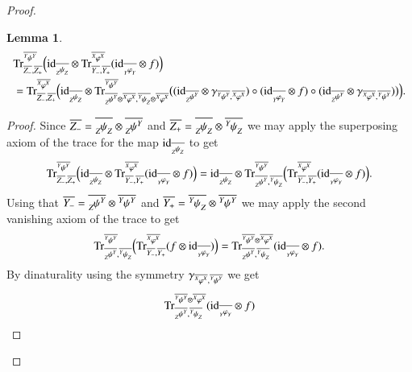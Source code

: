 \documentclass{amsart}
\def\tn{\textnormal}
\def\Trace{\tn{Tr}}
\def\ol{\overline}
\def\id{\tn{id}}
\newcommand{\inp}[1]{{#1_-}}
\newcommand{\outp}[1]{{#1_+}}
\newcommand{\feeddd}[3]{{\tensor*[^{#2}_{\color{white}{!}}]{{#1}}{^{#3}}}}%
\newcommand{\feeddc}[3]{{\tensor*[^{#2}]{{#1}}{_{#3}}}}
\newcommand{\feedcd}[3]{{\tensor*[_{#2}]{{#1}}{^{#3}}}}
\newcommand{\feedcc}[3]{{\tensor*[^{\color{white}{!}}_{#2}]{{#1}}{_{#3}}}}
\newtheorem{lemma}[subsubsection]{Lemma}
\theoremstyle{remark}
\theoremstyle{definition}
\begin{document}
\begin{proof}
\begin{lemma}\label{le:combining traces}
 \begin{align*}
&\Trace^{\ol{\feeddd{\psi}{Y}{Y}}}_{\ol{Z_-},\ol{Z_+}}
\Big(
\id_{\ol{\feedcc{\psi}{Z}{Z}}}\otimes
\Trace^{\ol{\feeddd{\varphi}{X}{X}}}_{\ol{Y_-},\ol{Y_+}}(\id_{\ol{\feedcc{\varphi}{Y}{Y}}}\otimes f)
\Big)\\
&=\Trace^{\ol{\feeddd{\varphi}{X}{X}}}_{\ol{\inp{Z}},\ol{\outp{Z}}}
\Big(
\id_{\ol{\feedcc{\psi}{Z}{Z}}}\otimes\Trace^{\ol{\feeddd{\psi}{Y}{Y}}}_{\ol{\feedcd{\psi}{Z}{Y}}\otimes\ol{\feeddd{\varphi}{X}{X}},\ol{\feeddc{\psi}{Y}{Z}}\otimes\ol{\feeddd{\varphi}{X}{X}}}
\big(
(\id_{\ol{\feedcd{\psi}{Z}{Y}}}\otimes\gamma_{\ol{\feeddd{\psi}{Y}{Y}},\ol{\feeddd{\varphi}{X}{X}}})\circ(\id_{\ol{\feedcc{\varphi}{Y}{Y}}}\otimes f)\circ(\id_{\ol{\feedcd{\psi}{Z}{Y}}}\otimes\gamma_{\ol{\feeddd{\varphi}{X}{X}},\ol{\feeddd{\psi}{Y}{Y}}})
\big)
\Big).
\end{align*}
\end{lemma}
\begin{proof}
Since $\ol{Z_-}=\ol{\feedcc{\psi}{Z}{Z}}\otimes\ol{\feedcd{\psi}{Z}{Y}}$ and $\ol{Z_+}=\ol{\feedcc{\psi}{Z}{Z}}\otimes\ol{\feeddc{\psi}{Y}{Z}}$ we may apply the superposing axiom of the trace for the map $\id_{\ol{\feedcc{\psi}{Z}{Z}}}$ to get
\[\Trace^{\ol{\feeddd{\psi}{Y}{Y}}}_{\ol{Z_-},\ol{Z_+}}
\Big(
\id_{\ol{\feedcc{\psi}{Z}{Z}}}\otimes\Trace^{\ol{\feeddd{\varphi}{X}{X}}}_{\ol{Y_-},\ol{Y_+}}(\id_{\ol{\feedcc{\varphi}{Y}{Y}}}\otimes f)
\Big)=\id_{\ol{\feedcc{\psi}{Z}{Z}}}\otimes\Trace^{\ol{\feeddd{\psi}{Y}{Y}}}_{\ol{\feedcd{\psi}{Z}{Y}},\ol{\feeddc{\psi}{Y}{Z}}}
\Big(
\Trace^{\ol{\feeddd{\varphi}{X}{X}}}_{\ol{Y_-},\ol{Y_+}}(\id_{\ol{\feedcc{\varphi}{Y}{Y}}}\otimes f)
\Big).\]
Using that $\ol{Y_-}=\ol{\feedcd{\psi}{Z}{Y}}\otimes\ol{\feeddd{\psi}{Y}{Y}}$ and $\ol{Y_+}=\ol{\feeddc{\psi}{Y}{Z}}\otimes\ol{\feeddd{\psi}{Y}{Y}}$ we may apply the second vanishing axiom of the trace to get
\[\Trace^{\ol{\feeddd{\psi}{Y}{Y}}}_{\ol{\feedcd{\psi}{Z}{Y}},\ol{\feeddc{\psi}{Y}{Z}}}
\Big(\Trace^{\ol{\feeddd{\varphi}{X}{X}}}_{\ol{\inp{Y}},\ol{\outp{Y}}}(f\otimes\id_{\ol{\feedcc{\varphi}{Y}{Y}}})\Big)=\Trace^{\ol{\feeddd{\psi}{Y}{Y}}\otimes\ol{\feeddd{\varphi}{X}{X}}}_{\ol{\feedcd{\psi}{Z}{Y}},\ol{\feeddc{\psi}{Y}{Z}}}
(\id_{\ol{\feedcc{\varphi}{Y}{Y}}}\otimes f).\]
By dinaturality using the symmetry $\gamma_{\ol{\feeddd{\varphi}{X}{X}},\ol{\feeddd{\psi}{Y}{Y}}}$ we get
\[\Trace^{\ol{\feeddd{\psi}{Y}{Y}}\otimes\ol{\feeddd{\varphi}{X}{X}}}_{\ol{\feedcd{\psi}{Z}{Y}},\ol{\feeddc{\psi}{Y}{Z}}}
(\id_{\ol{\feedcc{\varphi}{Y}{Y}}}\otimes f)
\]
\end{proof}
\end{proof}
\end{document}
